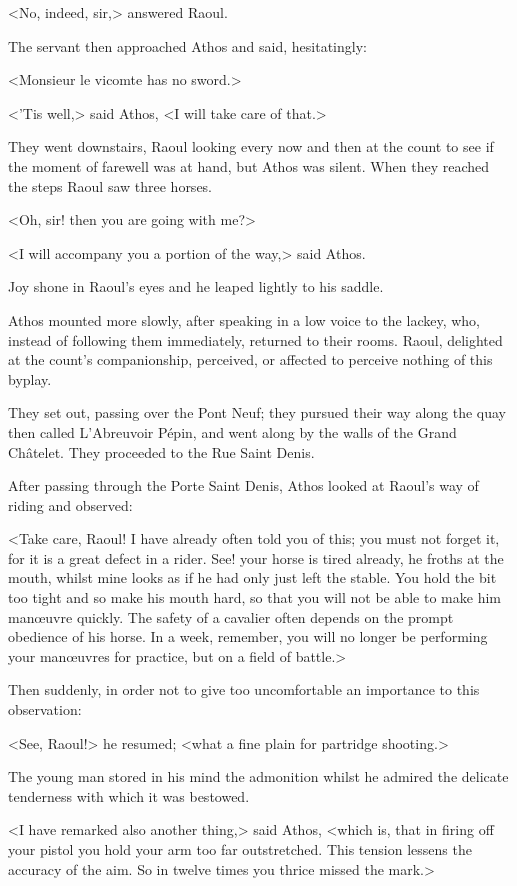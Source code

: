 <No, indeed, sir,> answered Raoul.

The servant then approached Athos and said, hesitatingly:

<Monsieur le vicomte has no sword.>

<'Tis well,> said Athos, <I will take care of that.>

They went downstairs, Raoul looking every now and then at the count to see if the moment of farewell was at hand, but Athos was silent. When they reached the steps Raoul saw three horses.

<Oh, sir! then you are going with me?>

<I will accompany you a portion of the way,> said Athos.

Joy shone in Raoul's eyes and he leaped lightly to his saddle.

Athos mounted more slowly, after speaking in a low voice to the lackey, who, instead of following them immediately, returned to their rooms. Raoul, delighted at the count's companionship, perceived, or affected to perceive nothing of this byplay.

They set out, passing over the Pont Neuf; they pursued their way along the quay then called L'Abreuvoir Pépin, and went along by the walls of the Grand Châtelet. They proceeded to the Rue Saint Denis.

After passing through the Porte Saint Denis, Athos looked at Raoul's way of riding and observed:

<Take care, Raoul! I have already often told you of this; you must not forget it, for it is a great defect in a rider. See! your horse is tired already, he froths at the mouth, whilst mine looks as if he had only just left the stable. You hold the bit too tight and so make his mouth hard, so that you will not be able to make him manœuvre quickly. The safety of a cavalier often depends on the prompt obedience of his horse. In a week, remember, you will no longer be performing your manœuvres for practice, but on a field of battle.>

Then suddenly, in order not to give too uncomfortable an importance to this observation:

<See, Raoul!> he resumed; <what a fine plain for partridge shooting.>

The young man stored in his mind the admonition whilst he admired the delicate tenderness with which it was bestowed.

<I have remarked also another thing,> said Athos, <which is, that in firing off your pistol you hold your arm too far outstretched. This tension lessens the accuracy of the aim. So in twelve times you thrice missed the mark.>

